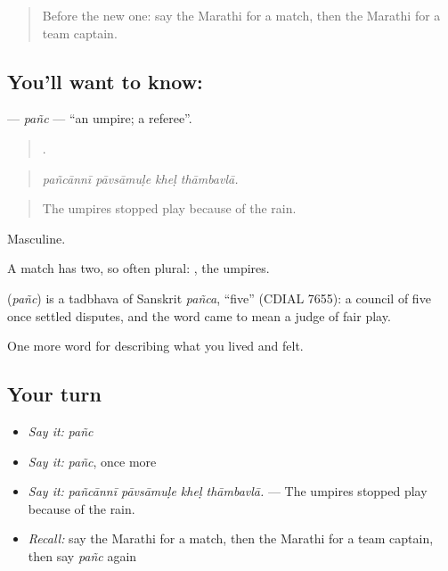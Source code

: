 \label{lesson:MR-C529-panc}



\begin{quote}
Before the new one: say the Marathi for a match, then the Marathi for a team captain.
\end{quote}

\subsection*{You'll want to know: }
\textbf{} — \emph{pañc} — \textquotedblleft{}an umpire; a referee\textquotedblright{}.

\begin{quote}
   .
\end{quote}

\begin{quote}
\emph{pañcānnī pāvsāmuḷe kheḷ thāmbavlā.}
\end{quote}

\begin{quote}
The umpires stopped play because of the rain.
\end{quote}

Masculine.

A match has two, so often plural: , the umpires.

\begin{cousinweb}
\textbf{} (\emph{pañc}) is a tadbhava of Sanskrit \emph{pañca}, \textquotedblleft{}five\textquotedblright{} (CDIAL 7655): a council of five once settled disputes, and the word came to mean a judge of fair play.
\end{cousinweb}

\begin{grammarlens}[title={What you've built}]
One more word for describing what you lived and felt.
\end{grammarlens}

\subsection*{Your turn}
\begin{itemize}
\raggedright
  \item \emph{Say it:} \emph{pañc}
  \item \emph{Say it:} \emph{pañc}, once more
  \item \emph{Say it:} \emph{pañcānnī pāvsāmuḷe kheḷ thāmbavlā.} — The umpires stopped play because of the rain.
  \item \emph{Recall:} say the Marathi for a match, then the Marathi for a team captain, then say \emph{pañc} again
\end{itemize}


